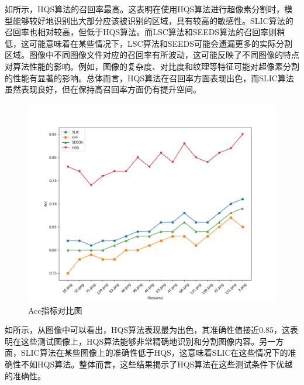 如所示，HQS算法的召回率最高。这表明在使用HQS算法进行超像素分割时，模型能够较好地识别出大部分应该被识别的区域，具有较高的敏感性。SLIC算法的召回率也相对较高，但低于HQS算法。而LSC算法和SEEDS算法的召回率则稍低，这可能意味着在某些情况下，LSC算法和SEEDS可能会遗漏更多的实际分割区域。图像中不同图像文件对应的召回率有所波动，这可能反映了不同图像的特点对算法性能的影响。例如，图像的复杂度、对比度和纹理等特征可能对超像素分割的性能有显著的影响。总体而言，HQS算法在召回率方面表现出色，而SLIC算法虽然表现良好，但在保持高召回率方面仍有提升空间。

\newpage

\begin{figure}[htbp]
	\centering
	\includegraphics[width=1\textwidth]{pic/Acc.png}
	\caption{Acc指标对比图}
    \label{fig:acc}
\end{figure}

如所示，从图像中可以看出，HQS算法表现最为出色，其准确性值接近0.85，这表明在这些测试图像上，HQS算法能够非常精确地识别和分割图像内容。另一方面，SLIC算法在某些图像上的准确性低于HQS，这意味着SLIC在这些情况下的准确性不如HQS算法。整体而言，这些结果揭示了HQS算法在这些测试条件下优越的准确性。

